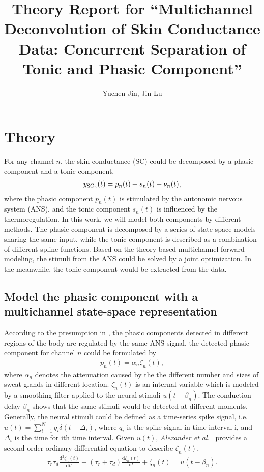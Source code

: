 \documentclass[]{article}
\title{Theory Report for ``Multichannel Deconvolution of Skin Conductance Data: Concurrent Separation of Tonic and Phasic Component''}
\author{Yuchen Jin, Jin Lu}
\providecommand{\od}{\mathrm{d}}
\begin{document}
\maketitle

\section{Theory}

For any channel $n$, the skin conductance (SC) could be decomposed by a phasic component and a tonic component,
\begin{align}
  y_{\rm{SC}_n}(t) = p_n(t) + s_n(t) + \nu_n(t),
\end{align}
where the phasic component $p_n(t)$ is stimulated by the autonomic nervous system (ANS), and the tonic component $s_n(t)$ is influenced by the thermoregulation. In this work, we will model both components by different methods. The phasic component is decomposed by a series of state-space models sharing the same input, while the tonic component is described as a combination of different spline functions. Based on the theory-based multichannel forward modeling, the stimuli from the ANS could be solved by a joint optimization. In the meanwhile, the tonic component would be extracted from the data.

\subsection{Model the phasic component with a multichannel state-space representation}
According to the presumption in \cite{alexander2005separating,society2012publication,amin2019robust}, the phasic components detected in different regions of the body are regulated by the same ANS signal, the detected phasic component for channel $n$ could be formulated by
\begin{align}
  p_n(t) = \alpha_n \zeta_n (t),
\end{align}
where $\alpha_n$ denotes the attenuation caused by the the different number and sizes of sweat glands in different location. $\zeta_n(t)$ is an internal variable which is modeled by a smoothing filter applied to the neural stimuli $u(t-\beta_n)$. The conduction delay $\beta_n$ shows that the same stimuli would be detected at different moments. Generally, the neural stimuli could be defined as a time-series spike signal, i.e. $u(t) = \sum_{i=1}^N q_i \delta(t - \Delta_i)$, where $q_i$ is the spike signal in time interval i, and $\Delta_i$ is the time for ith time interval. Given $u(t)$, \textit{Alexander et al.}~\cite{alexander2005separating} provides a second-order ordinary differential equation to describe $\zeta_n(t)$,
\begin{align} \label{fml:the:ode}
  \tau_r \tau_d \frac{\od^2 \zeta_n(t)}{\od t^2} + (\tau_r + \tau_d) \frac{\od \zeta_n(t)}{\od t} + \zeta_n(t) = u(t - \beta_n).
\end{align}
\end{document}
